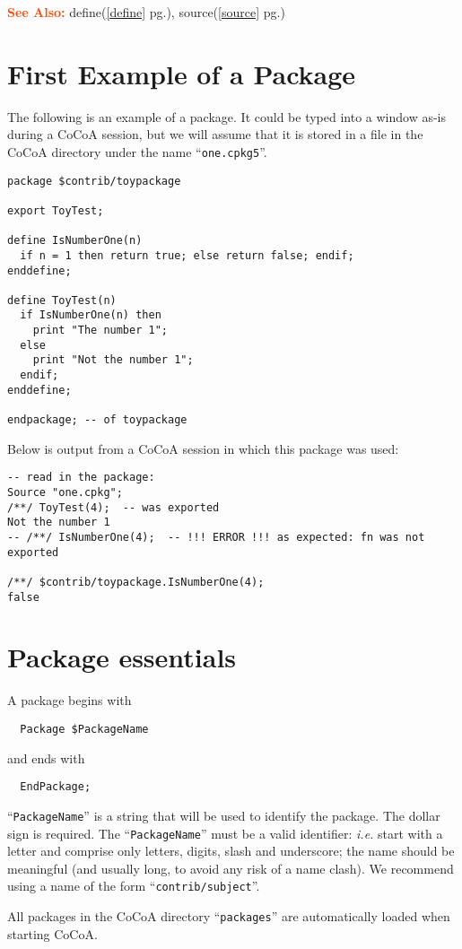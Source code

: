 \documentclass[a4paper]{mybook}
\newcommand\SeeAlso{\par\textcolor{OrangeRed}{\textbf{\large See Also: }}}
\begin{document}
\SeeAlso %
  define(\ref{define} pg.\pageref{define}), 
    source(\ref{source} pg.\pageref{source})

\section{First Example of a Package}
\label{First Example of a Package}

        
The following is an example of a package.  It could be typed into a
window as-is during a CoCoA session, but we will assume that it is
stored in a file in the CoCoA directory under the name ``\verb&one.cpkg5&''.
\begin{Verbatim}[label=example, rulecolor=\color{PineGreen}, frame=single]
package $contrib/toypackage

export ToyTest;

define IsNumberOne(n)
  if n = 1 then return true; else return false; endif;
enddefine;

define ToyTest(n)
  if IsNumberOne(n) then
    print "The number 1";
  else
    print "Not the number 1";
  endif;
enddefine;

endpackage; -- of toypackage
\end{Verbatim}


Below is output from a CoCoA session in which this package was used:
\begin{Verbatim}[label=example, rulecolor=\color{PineGreen}, frame=single]
-- read in the package:
Source "one.cpkg";
/**/ ToyTest(4);  -- was exported
Not the number 1
-- /**/ IsNumberOne(4);  -- !!! ERROR !!! as expected: fn was not exported

/**/ $contrib/toypackage.IsNumberOne(4);
false
\end{Verbatim}



\section{Package essentials}
\label{Package essentials}

        
A package begins with
\begin{verbatim}
  Package $PackageName
\end{verbatim}
and ends with
\begin{verbatim}
  EndPackage;
\end{verbatim}
``\verb&PackageName&'' is a string that will be used to identify the package.
The dollar sign is required.  The ``\verb&PackageName&'' must be a valid
identifier: \textit{i.e.} start with a letter and comprise only letters,
digits, slash and underscore; the name should be meaningful (and
usually long, to avoid any risk of a name clash).  We recommend using
a name of the form ``\verb&contrib/subject&''.
\par 
All packages in the CoCoA directory ``\verb&packages&'' are
automatically loaded when starting CoCoA.
\end{document}

